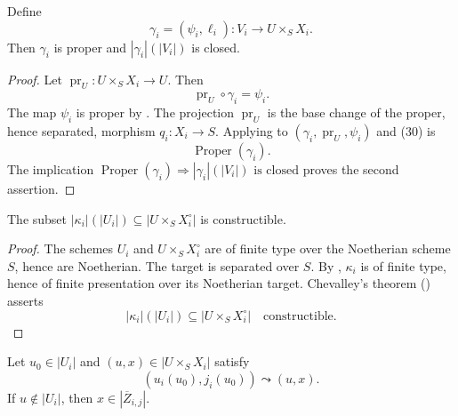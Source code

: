 \begin{lemma}
  \label{lemma:nagata-proper-extension-graph-closed}

  Define
  \[
    \gamma_i=(\psi_i,\ell_i)\colon V_i\to U\times_SX_i.
  \]
  Then $\gamma_i$ is proper and $|\gamma_i|(|V_i|)$ is closed.
\end{lemma}

\begin{proof}
  Let $\operatorname{pr}_U\colon U\times_SX_i\to U$.  Then
  \[
    \operatorname{pr}_U\circ\gamma_i=\psi_i.                       \tag{30}
  \]
  The map $\psi_i$ is proper by
  .  The projection
  $\operatorname{pr}_U$ is the base change of the proper, hence separated,
  morphism $q_i\colon X_i\to S$.  Applying
   to
  $(\gamma_i,\operatorname{pr}_U,\psi_i)$ and (30) is
  \[
    \operatorname{Proper}(\gamma_i).
  \]
  The implication
  $\operatorname{Proper}(\gamma_i)\Rightarrow
    |\gamma_i|(|V_i|)\text{ is closed}$
  proves the second assertion.
\end{proof}

\begin{lemma}
  \label{lemma:nagata-intermediate-overlap-constructible}

  The subset $|\kappa_i|(|U_i|)\subseteq|U\times_SX_i^\circ|$ is constructible.
\end{lemma}

\begin{proof}
  The schemes $U_i$ and $U\times_SX_i^\circ$ are of finite type over the
  Noetherian scheme $S$, hence are Noetherian.  The target is separated over
  $S$.  By ,
  $\kappa_i$ is of finite type, hence of finite presentation over its
  Noetherian target.  Chevalley's theorem
  (\cite[\href{https://stacks.math.columbia.edu/tag/054K}{Tag 054K}]
  {stacks-project}) asserts
  \[
    |\kappa_i|(|U_i|)\subseteq|U\times_SX_i^\circ|
    \quad\text{constructible}.
  \]
\end{proof}

\begin{lemma}
  \label{lemma:nagata-intermediate-specialization-boundary}

  Let $u_0\in|U_i|$ and $(u,x)\in|U\times_SX_i|$ satisfy
  \[
    (u_i(u_0),j_i(u_0))\leadsto(u,x).
  \]
  If $u\notin|U_i|$, then $x\in|\overline Z_{i,j}|$.
\end{lemma}

